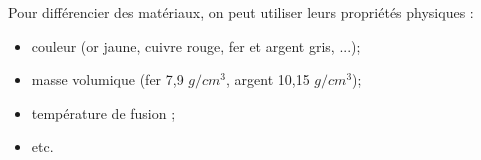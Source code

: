 \begin{mybilan}
	
	Pour différencier des matériaux, on peut utiliser leurs propriétés physiques :
	\begin{itemize}
		\item couleur (or jaune, cuivre rouge, fer et argent gris, ...);
		\item masse volumique (fer 7,9 $g/cm^3$,  argent 10,15 $g/cm^3$);
		\item température de fusion ;
		\item etc.
	\end{itemize}
\end{mybilan}